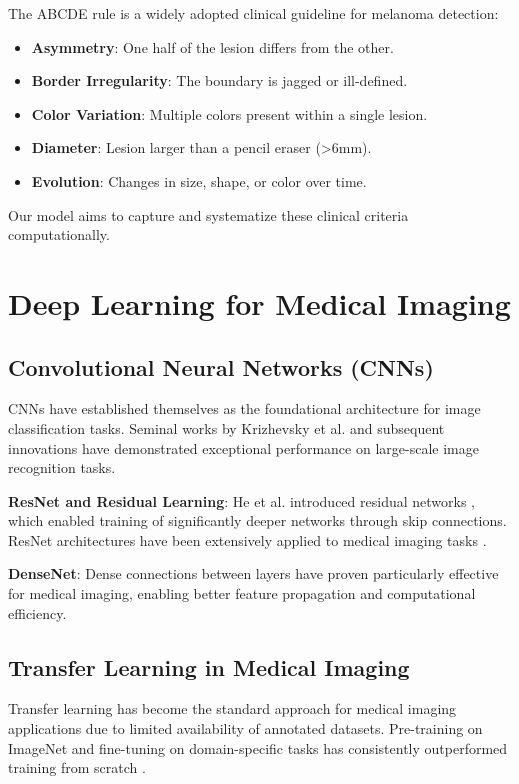The ABCDE rule is a widely adopted clinical guideline for melanoma detection:

\begin{itemize}
    \item \textbf{Asymmetry}: One half of the lesion differs from the other.
    \item \textbf{Border Irregularity}: The boundary is jagged or ill-defined.
    \item \textbf{Color Variation}: Multiple colors present within a single lesion.
    \item \textbf{Diameter}: Lesion larger than a pencil eraser (>6mm).
    \item \textbf{Evolution}: Changes in size, shape, or color over time.
\end{itemize}

Our model aims to capture and systematize these clinical criteria computationally.

\section{Deep Learning for Medical Imaging}

\subsection{Convolutional Neural Networks (CNNs)}

CNNs have established themselves as the foundational architecture for image classification tasks. Seminal works by Krizhevsky et al. \cite{krizhevsky2012imagenet} and subsequent innovations have demonstrated exceptional performance on large-scale image recognition tasks.

\textbf{ResNet and Residual Learning}: He et al. introduced residual networks \cite{he2016deep}, which enabled training of significantly deeper networks through skip connections. ResNet architectures have been extensively applied to medical imaging tasks \cite{ron2019deep}.

\textbf{DenseNet}: Dense connections \cite{huang2017densely} between layers have proven particularly effective for medical imaging, enabling better feature propagation and computational efficiency.

\subsection{Transfer Learning in Medical Imaging}

Transfer learning has become the standard approach for medical imaging applications due to limited availability of annotated datasets. Pre-training on ImageNet and fine-tuning on domain-specific tasks has consistently outperformed training from scratch \cite{raghu2019transfusion}.

